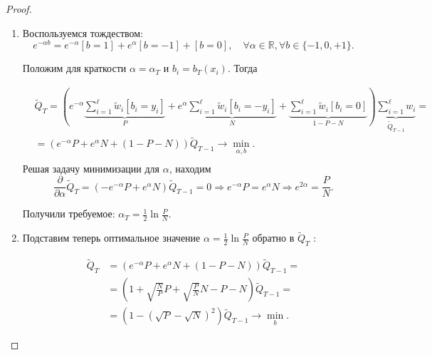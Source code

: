 \begin{proof}
    \begin{enumerate}[1)]
        \item Воспользуемся тождеством:
              \begin{equation*}
                  e^{-\alpha b}=e^{-\alpha}[b=1]+e^\alpha[b=-1]+[b=0],\quad \forall \alpha \in \mathbb{R}, \forall b \in\{-1, 0, +1\}.
              \end{equation*}




              Положим для краткости $\alpha=\alpha_T$ и $b_i=b_T\left(x_i\right)$. Тогда

              \begin{equation*}
                  \begin{aligned}
                       & \widetilde{Q}_T=(e^{-\alpha} \underbrace{\sum_{i=1}^{\ell} \tilde{w}_i\left[b_i=y_i\right]}_P+e^\alpha \underbrace{\sum_{i=1}^{\ell} \tilde{w}_i\left[b_i=-y_i\right]}_N+\underbrace{\sum_{i=1}^{\ell} \tilde{w}_i\left[b_i=0\right]}_{1-P-N}) \underbrace{\sum_{i=1}^{\ell} w_i}_{\tilde{Q}_{T-1}}= \\
                       & =\left(e^{-\alpha} P+e^\alpha N+(1-P-N)\right) \widetilde{Q}_{T-1} \rightarrow \min _{\alpha, b}.                                                                                                                                                                                                    \\
                  \end{aligned}
              \end{equation*}
              Решая задачу минимизации для $\alpha$, находим
              \begin{equation*}
                  \frac{\partial}{\partial \alpha} \widetilde{Q}_T=\left(-e^{-\alpha} P+e^\alpha N\right) \widetilde{Q}_{T-1}=0 \Rightarrow e^{-\alpha} P=e^\alpha N \Rightarrow e^{2 \alpha}=\frac{P}{N} .
              \end{equation*}

              Получили требуемое: $\alpha_T=\frac{1}{2} \ln \frac{P}{N}$.

        \item Подставим теперь оптимальное значение $\alpha=\frac{1}{2} \ln \frac{P}{N}$ обратно в $\widetilde{Q}_T$ :

              \begin{equation*}
                  \begin{aligned}
                      \widetilde{Q}_T & =\left(e^{-\alpha} P+e^\alpha N+(1-P-N)\right) \widetilde{Q}_{T-1}=                \\
                                      & =\left(1+\sqrt{\frac{N}{P}} P+\sqrt{\frac{P}{N}} N-P-N\right) \widetilde{Q}_{T-1}= \\
                                      & =\left(1-(\sqrt{P}-\sqrt{N})^2\right) \widetilde{Q}_{T-1} \rightarrow \min _b .
                  \end{aligned}
              \end{equation*}



\end{enumerate}
\end{proof}
